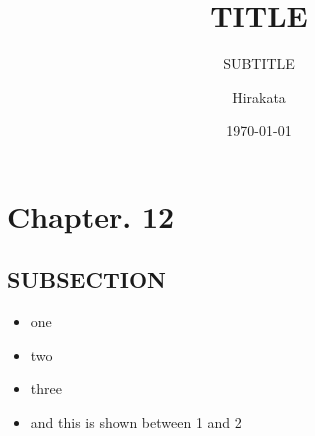 \documentclass[12pt, dvipdfmx, default, cjk]{beamer}
\title{TITLE}
\subtitle{SUBTITLE}
\author[cympfh]{Hirakata}
\institute[CS]{Univ. of Tokyo, CS}
\date{\today}
\begin{document}
\section{Chapter. 12}

\begin{frame} \titlepage \end{frame}
\begin{frame} \tableofcontents \end{frame}

\subsection{SUBSECTION}

\begin{frame}

  \begin{itemize}
    \item<1-> one
    \item<2-> two
    \item<3-> three
    \item<1-2> and this is shown between 1 and 2
  \end{itemize}
\end{frame}
\end{document}
